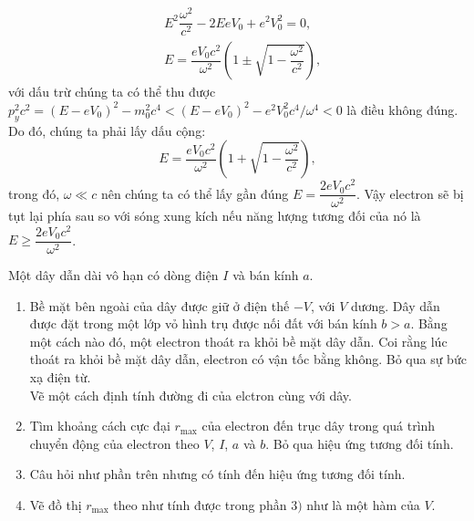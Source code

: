 \begin{loigiai}
\begin{enumerate}[1)]
\[\begin{aligned}
    &E^2\dfrac{\omega^2}{c^2}-2EeV_0+e^2V_0^2 = 0,\\
    &E = \dfrac{eV_0c^2}{\omega^2}\left(1\pm\sqrt{1-\dfrac{\omega^2}{c^2}}\right),
\end{aligned}\]
với dấu trừ chúng ta có thể thu được $p_{y}^2c^2=(E-eV_0)^2-m_0^2c^4<(E-eV_0)^2-e^2V_0^2c^4/\omega^4<0$ là điều không đúng. Do đó, chúng ta phải lấy dấu cộng:
\[E=\dfrac{eV_0c^2}{\omega^2}\left(1+\sqrt{1-\dfrac{\omega^2}{c^2}}\right),\]
trong đó, $\omega \ll c$ nên chúng ta có thể lấy gần đúng $E=\dfrac{2eV_0c^2}{\omega^2}$. Vậy electron sẽ bị tụt lại phía sau so với sóng xung kích nếu năng lượng tương đối của nó là $E\geq\dfrac{2eV_0c^2}{\omega^2}$.
\end{enumerate}
\end{loigiai}


\begin{vd}
    Một dây dẫn dài vô hạn có dòng điện $I$ và bán kính $a$.
    \begin{enumerate}[1)]
        \item Bề mặt bên ngoài của dây được giữ ở điện thế $-V$, với $V$ dương. Dây dẫn được đặt trong một lớp vỏ hình trụ được nối đất với bán kính $b>a$. Bằng một cách nào đó, một electron thoát ra khỏi bề mặt dây dẫn. Coi rằng lúc thoát ra khỏi bề mặt dây dẫn, electron có vận tốc bằng không. Bỏ qua sự bức xạ điện từ.\\
        Vẽ một cách định tính đường đi của elctron cùng với dây.
        \item Tìm khoảng cách cực đại $r_{\max}$ của electron đến trục dây trong quá trình chuyển động của electron theo $V$, $I$, $a$ và $b$.
        Bỏ qua hiệu ứng tương đối tính.
        \item Câu hỏi như phần trên nhưng có tính đến hiệu ứng tương đối tính.
        \item Vẽ đồ thị $r_{\max}$ theo như tính được trong phần $3)$ như là một hàm của $V$.
    \end{enumerate}
    \end{vd}

